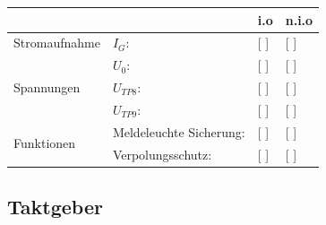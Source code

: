 \documentclass[a4paper,11pt]{scrartcl}
\begin{document}
\renewcommand{\arraystretch}{2}
\begin{tabularx}{\textwidth}{p{}| p{} | p{} | p{}}

 &  & i.o & n.i.o \\

\hline

Stromaufnahme & $I_{G}$: & [ ] & [ ] \\

\hline

\multirow{3}{*}{Spannungen}
		& $U_{0}$:					&	[ ] & [ ] 	\\
		& $U_{TP8}$: 				&	[ ]	& [ ] 	\\
		& $U_{TP9}$: 				&	[ ] & [ ]  	\\
		
\hline		
		
\multirow{2}{*}{Funktionen}
		& Meldeleuchte Sicherung:  	& [ ] & [ ] 	\\
		& Verpolungsschutz:				& [ ] & [ ] 	\\ 

\end{tabularx}
\renewcommand{\arraystretch}{1}



\newpage
\subsection{Taktgeber}

\end{document}
